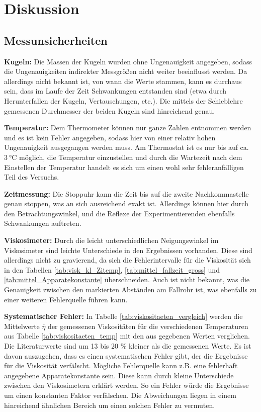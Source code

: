 \section{Diskussion}

\subsection[]{Messunsicherheiten}
\textbf{Kugeln:}
Die Massen der Kugeln wurden ohne Ungenauigkeit angegeben, sodass die Ungenauigkeiten indirekter Messgrößen nicht weiter beeinflusst werden.
Da allerdings nicht bekannt ist, von wann die Werte stammen, kann es durchaus sein, dass im Laufe der Zeit Schwankungen entstanden sind
(etwa durch Herunterfallen der Kugeln, Vertauschungen, etc.).
Die mittels der Schieblehre gemessenen Durchmesser der beiden Kugeln sind hinreichend genau.

\noindent
\textbf{Temperatur:}
Dem Thermometer können nur ganze Zahlen entnommen werden und es ist kein Fehler angegeben, sodass hier von einer relativ hohen Ungenauigkeit ausgegangen werden muss.
Am Thermostat ist es nur bis auf ca. $\qty{3}{\degreeCelsius}$ möglich, die Temperatur einzustellen und durch die Wartezeit nach dem Einstellen der Temperatur
handelt es sich um einen wohl sehr fehleranfälligen Teil des Versuchs.

\noindent
\textbf{Zeitmessung:}
Die Stoppuhr kann die Zeit bis auf die zweite Nachkommastelle genau stoppen, was an sich ausreichend exakt ist.
Allerdings können hier durch den Betrachtungswinkel, und die Reflexe der Experimentierenden ebenfalls Schwankungen auftreten.

\noindent
\textbf{Viskosimeter:}
Durch die leicht unterschiedlichen Neigungswinkel im Viskosimeter sind leichte Unterschiede in den Ergebnissen vorhanden.
Diese sind allerdings nicht zu gravierend, da sich die Fehlerintervalle für die Viskosität sich in den Tabellen
 \ref{tab:visk_kl_Zitemp}, \ref{tab:mittel_fallzeit_gross} und \ref{tab:mittel_Apparatekonstante} überschneiden.
Auch ist nicht bekannt, was die Genauigkeit zwischen den markierten Abständen am Fallrohr ist, was ebenfalls zu einer weiteren Fehlerquelle führen kann.

\noindent
\textbf{Systematischer Fehler:} 
In Tabelle \ref{tab:viskositaeten_vergleich} werden die Mittelwerte $\overline{\eta}$ der gemessenen Viskositäten für die verschiedenen Temperaturen aus Tabelle \ref{tab:viskositaeten_temp}
mit den aus \cite[][290]{geschke} gegebenen Werten verglichen.
Die Literaturwerte sind um 13 bis 20 \% kleiner als die gemessenen Werte.
Es ist davon auszugehen, dass es einen systematischen Fehler gibt, der die Ergebnisse für die
Viskosität verfälscht.
Mögliche Fehlerquelle kann z.B. eine fehlerhaft angegebene Apparatekonstante sein.
Diese kann durch kleine Unterschiede zwischen den Viskosimetern erklärt werden.
So ein Fehler würde die Ergebnisse um einen konstanten Faktor verfälschen.
Die Abweichungen liegen in einem hinreichend ähnlichen Bereich um einen solchen Fehler zu vermuten.


